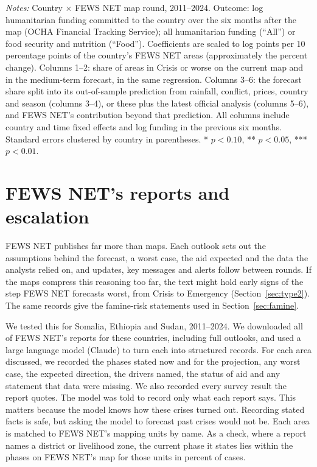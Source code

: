 \documentclass[11pt]{article}
\begin{document}
\begin{appendices}
\begin{table}[htbp]
\caption{Humanitarian funding and FEWS NET's maps and forecasts, within countries}\label{tab:money}
\scriptsize
\resizebox{\textwidth}{!}{}
\par\vspace{4pt}\begin{minipage}{\textwidth}\scriptsize \textit{Notes:} Country $\times$ FEWS NET map round, 2011--2024. Outcome: log humanitarian funding committed to the country over the six months after the map (OCHA Financial Tracking Service); all humanitarian funding (``All'') or food security and nutrition (``Food''). Coefficients are scaled to log points per 10 percentage points of the country's FEWS NET areas (approximately the percent change). Columns 1--2: share of areas in Crisis or worse on the current map and in the medium-term forecast, in the same regression. Columns 3--6: the forecast share split into its out-of-sample prediction from rainfall, conflict, prices, country and season (columns 3--4), or these plus the latest official analysis (columns 5--6), and FEWS NET's contribution beyond that prediction. All columns include country and time fixed effects and log funding in the previous six months. Standard errors clustered by country in parentheses. * $p<0.10$, ** $p<0.05$, *** $p<0.01$.
\end{minipage}

\end{table}

\section{FEWS NET's reports and escalation}\label{app:text}

FEWS NET publishes far more than maps. Each outlook sets out the assumptions behind the forecast, a worst case, the aid expected and the data the analysts relied on, and updates, key messages and alerts follow between rounds. If the maps compress this reasoning too far, the text might hold early signs of the step FEWS NET forecasts worst, from Crisis to Emergency (Section~\ref{sec:type2}). The same records give the famine-risk statements used in Section~\ref{sec:famine}.

We tested this for Somalia, Ethiopia and Sudan, 2011--2024. We downloaded all \txtReports{} of FEWS NET's reports for these countries, including \txtOutlooks{} full outlooks, and used a large language model (Claude) to turn each into structured records. For each area discussed, we recorded the phases stated now and for the projection, any worst case, the expected direction, the drivers named, the status of aid and any statement that data were missing. We also recorded every survey result the report quotes. The model was told to record only what each report says. This matters because the model knows how these crises turned out. Recording stated facts is safe, but asking the model to forecast past crises would not be. Each area is matched to FEWS NET's mapping units by name. As a check, where a report names a district or livelihood zone, the current phase it states lies within the phases on FEWS NET's map for those units in \txtMatch{} percent of \txtMatchN{} cases.


\end{appendices}
\end{document}
